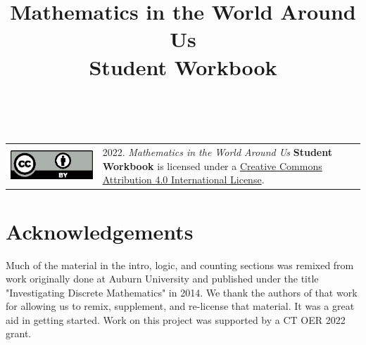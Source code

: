 \documentclass[twoside,letterpaper,12pt]{report}
\title{\vspace{2.5in}
Mathematics in the World Around Us\\
Student Workbook}
\begin{document}
\maketitle

\newpage
{}

\pagestyle{empty}

\mbox{ }
\vfill

\begin{center}
\begin{tabular}{c>{\raggedright}b{3.9in}}
\includegraphics{images/CC-by} & 2022. \textit{Mathematics in the World Around Us} \textbf{Student Workbook} is licensed under a \href{http://creativecommons.org/licenses/by/4.0/}{Creative Commons Attribution 4.0 International License}. \tabularnewline
\end{tabular}
\par\end{center}


\newpage

\pagestyle{plain}


\tableofcontents


\newpage

\chapter*{Acknowledgements}%

Much of the material in the intro, logic, and counting sections was remixed from work originally done at Auburn University and published under the title "Investigating Discrete Mathematics" in 2014. We thank the authors of that work for allowing us to remix, supplement, and re-license that material. It was a great aid in getting started. Work on this project was supported by a CT OER 2022 grant.

\newpage
\end{document}
